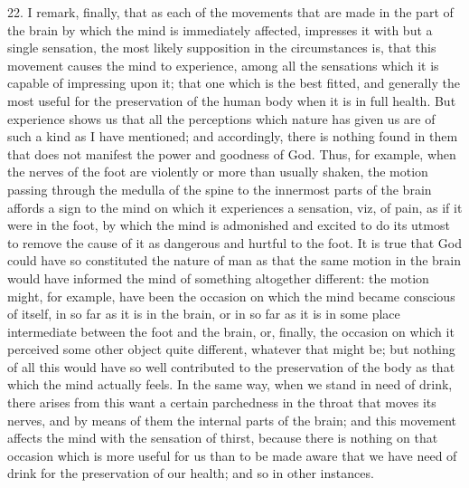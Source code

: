 22. I remark, finally, that as each of the movements that are made in the part of the brain by which the mind is immediately affected, impresses it with but a single sensation, the most likely supposition in the circumstances is, that this movement causes the mind to experience, among all the sensations which it is capable of impressing upon it; that one which is the best fitted, and generally the most useful for the preservation of the human body when it is in full health. But experience shows us that all the perceptions which nature has given us are of such a kind as I have mentioned; and accordingly, there is nothing found in them that does not manifest the power and goodness of God. Thus, for example, when the nerves of the foot are violently or more than usually shaken, the motion passing through the medulla of the spine to the innermost parts of the brain affords a sign to the mind on which it experiences a sensation, viz, of pain, as if it were in the foot, by which the mind is admonished and excited to do its utmost to remove the cause of it as dangerous and hurtful to the foot. It is true that God could have so constituted the nature of man as that the same motion in the brain would have informed the mind of something altogether different: the motion might, for example, have been the occasion on which the mind became conscious of itself, in so far as it is in the brain, or in so far as it is in some place intermediate between the foot and the brain, or, finally, the occasion on which it perceived some other object quite different, whatever that might be; but nothing of all this would have so well contributed to the preservation of the body as that which the mind actually feels. In the same way, when we stand in need of drink, there arises from this want a certain parchedness in the throat that moves its nerves, and by means of them the internal parts of the brain; and this movement affects the mind with the sensation of thirst, because there is nothing on that occasion which is more useful for us than to be made aware that we have need of drink for the preservation of our health; and so in other instances.

